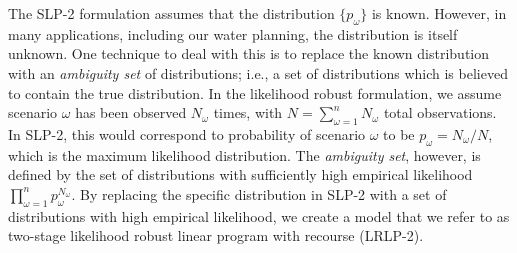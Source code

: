 \documentclass[11pt]{article}
\begin{document}
The SLP-2 formulation assumes that the distribution $\{p_\omega\}$ is known.
However, in many applications, including our water planning, the distribution is itself unknown.
One technique to deal with this is to replace the known distribution with an {\it ambiguity set} of distributions; i.e., a set of distributions which is believed to contain the true distribution.
In the likelihood robust formulation, we assume scenario $\omega$ has been observed $N_\omega$ times, with $N = \sum_{\omega=1}^n N_\omega$ total observations. 
In SLP-2, this would correspond to probability of scenario $\omega$ to be $p_\omega = N_\omega / N$, which is the maximum likelihood distribution. 
The {\it ambiguity set}, however, is defined by the set of distributions with sufficiently high empirical likelihood $\prod_{\omega=1}^n p_\omega^{N_\omega}$. 
By replacing the specific distribution in SLP-2 with a set of distributions with  high empirical likelihood, we create a model that we refer to as two-stage likelihood robust linear program with recourse (LRLP-2).
\end{document}
